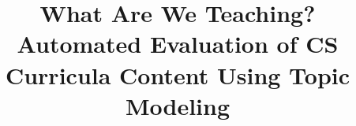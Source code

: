 \documentclass{sig-alternate}
\begin{document}
%

\title{What Are We Teaching? Automated Evaluation of CS Curricula Content Using Topic Modeling}


\maketitle







%
\end{document}
